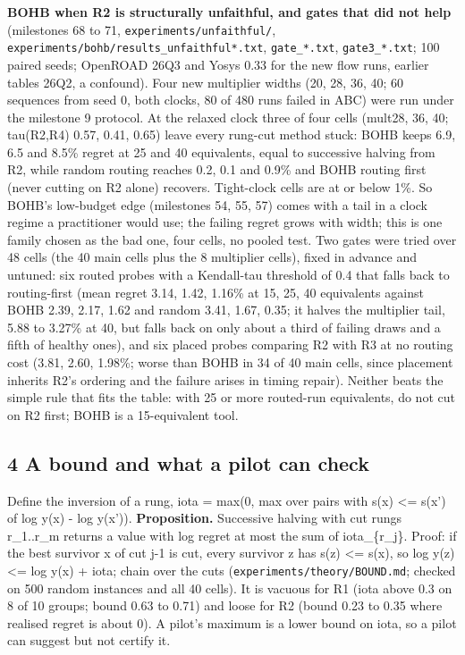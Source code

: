 \documentclass[conference]{IEEEtran}
\begin{document}
\textbf{BOHB when R2 is structurally unfaithful, and gates that did not
help} (milestones 68 to 71, \texttt{experiments/\allowbreak{}unfaithful/\allowbreak{}},
\texttt{experiments/\allowbreak{}bohb/\allowbreak{}results\_\allowbreak{}unfaithful*.txt},
\texttt{gate\_\allowbreak{}*.txt}, \texttt{gate3\_\allowbreak{}*.txt}; 100 paired seeds; OpenROAD
26Q3 and Yosys 0.33 for the new flow runs, earlier tables 26Q2, a
confound). Four new multiplier widths (20, 28, 36, 40; 60 sequences from
seed 0, both clocks, 80 of 480 runs failed in ABC) were run under the
milestone 9 protocol. At the relaxed clock three of four cells (mult28,
36, 40; tau(R2,R4) 0.57, 0.41, 0.65) leave every rung-cut method stuck:
BOHB keeps 6.9, 6.5 and 8.5\% regret at 25 and 40 equivalents, equal to
successive halving from R2, while random routing reaches 0.2, 0.1 and
0.9\% and BOHB routing first (never cutting on R2 alone) recovers.
Tight-clock cells are at or below 1\%. So BOHB's low-budget edge
(milestones 54, 55, 57) comes with a tail in a clock regime a
practitioner would use; the failing regret grows with width; this is one
family chosen as the bad one, four cells, no pooled test. Two gates were
tried over 48 cells (the 40 main cells plus the 8 multiplier cells),
fixed in advance and untuned: six routed probes with a Kendall-tau
threshold of 0.4 that falls back to routing-first (mean regret 3.14,
1.42, 1.16\% at 15, 25, 40 equivalents against BOHB 2.39, 2.17, 1.62 and
random 3.41, 1.67, 0.35; it halves the multiplier tail, 5.88 to 3.27\%
at 40, but falls back on only about a third of failing draws and a fifth
of healthy ones), and six placed probes comparing R2 with R3 at no
routing cost (3.81, 2.60, 1.98\%; worse than BOHB in 34 of 40 main
cells, since placement inherits R2's ordering and the failure arises in
timing repair). Neither beats the simple rule that fits the table: with
25 or more routed-run equivalents, do not cut on R2 first; BOHB is a
15-equivalent tool.

\hypertarget{a-bound-and-what-a-pilot-can-check}{%
\subsection{4 A bound and what a pilot can
check}\label{a-bound-and-what-a-pilot-can-check}}

Define the inversion of a rung, iota = max(0, max over pairs with s(x)
\textless= s(x') of log y(x) - log y(x')). \textbf{Proposition.}
Successive halving with cut rungs r\_1..r\_m returns a value with log
regret at most the sum of iota\_\{r\_j\}. Proof: if the best survivor x
of cut j-1 is cut, every survivor z has s(z) \textless= s(x), so log
y(z) \textless= log y(x) + iota; chain over the cuts
(\texttt{experiments/\allowbreak{}theory/\allowbreak{}BOUND.md}; checked on 500 random instances
and all 40 cells). It is vacuous for R1 (iota above 0.3 on 8 of 10
groups; bound 0.63 to 0.71) and loose for R2 (bound 0.23 to 0.35 where
realised regret is about 0). A pilot's maximum is a lower bound on iota,
so a pilot can suggest but not certify it.
\end{document}
